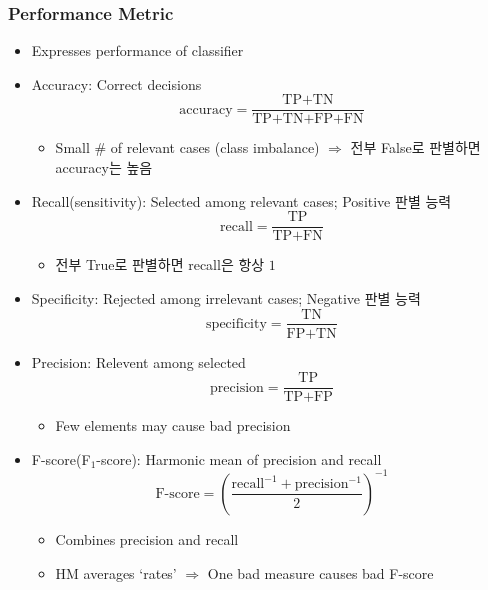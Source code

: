 \subsubsection*{Performance Metric}
\begin{itemize}
    \item Expresses performance of classifier
    \item Accuracy: Correct decisions
    \begin{equation}
        \text{accuracy}=\frac{\text{TP+TN}}{\text{TP+TN+FP+FN}}
    \end{equation}
    \begin{itemize}
        \item Small \# of relevant cases (class imbalance) $\Rightarrow$ 전부 False로 판별하면 accuracy는 높음
    \end{itemize}
    \item Recall(sensitivity): Selected among relevant cases; Positive 판별 능력
    \begin{equation}
        \text{recall}=\frac{\text{TP}}{\text{TP+FN}}
    \end{equation}
    \begin{itemize}
        \item 전부 True로 판별하면 recall은 항상 $1$
    \end{itemize}
    \item Specificity: Rejected among irrelevant cases; Negative 판별 능력
    \begin{equation}
        \text{specificity}=\frac{\text{TN}}{\text{FP+TN}}
    \end{equation}
    \item Precision: Relevent among selected
    \begin{equation}
        \text{precision}=\frac{\text{TP}}{\text{TP+FP}}
    \end{equation}
    \begin{itemize}
        \item Few elements may cause bad precision
    \end{itemize}
    \item F-score(F$_1$-score): Harmonic mean of precision and recall
    \begin{equation}
        \text{F-score}=\left(\frac{\text{recall}^{-1}+\text{precision}^{-1}}{2}\right)^{-1}
    \end{equation}
    \begin{itemize}
        \item Combines precision and recall
        \item HM averages `rates' $\Rightarrow$ One bad measure causes bad F-score
    \end{itemize}
\end{itemize}


